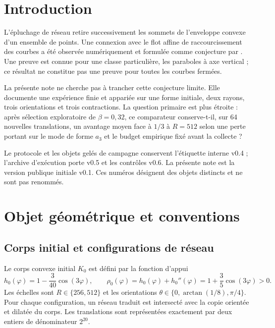 \documentclass[11pt,a4paper]{article}
\begin{document}
\tableofcontents

\section{Introduction}

L'épluchage de réseau retire successivement les sommets de l'enveloppe convexe d'un ensemble de points. Une connexion avec le flot affine de raccourcissement des courbes a été observée numériquement et formulée comme conjecture par \citet{eppstein2020}. Une preuve est connue pour une classe particulière, les paraboles à axe vertical \citep{rote2024}; ce résultat ne constitue pas une preuve pour toutes les courbes fermées.

La présente note ne cherche pas à trancher cette conjecture limite. Elle documente une expérience finie et appariée sur une forme initiale, deux rayons, trois orientations et trois contractions. La question primaire est plus étroite : après sélection exploratoire de $\beta=0{,}32$, ce comparateur conserve-t-il, sur 64 nouvelles translations, un avantage moyen face à $1/3$ à $R=512$ selon une perte portant sur le mode de forme $a_3$ et le budget empirique fixé avant la collecte ?

Le protocole et les objets gelés de campagne conservent l'étiquette interne v0.4 ; l'archive d'exécution porte v0.5 et les contrôles v0.6. La présente note est la version publique initiale v0.1. Ces numéros désignent des objets distincts et ne sont pas renommés.

\section{Objet géométrique et conventions}

\subsection{Corps initial et configurations de réseau}

Le corps convexe initial $K_0$ est défini par la fonction d'appui
\begin{equation}
  h_0(\varphi)=1-\frac{3}{40}\cos(3\varphi),
  \qquad
  \rho_0(\varphi)=h_0(\varphi)+h_0''(\varphi)
  =1+\frac{3}{5}\cos(3\varphi)>0.
\end{equation}
Les échelles sont $R\in\{256,512\}$ et les orientations
$\theta\in\{0,\arctan(1/8),\pi/4\}$. Pour chaque configuration, un réseau traduit est intersecté avec la copie orientée et dilatée du corps. Les translations sont représentées exactement par deux entiers de dénominateur $2^{20}$.
\end{document}
